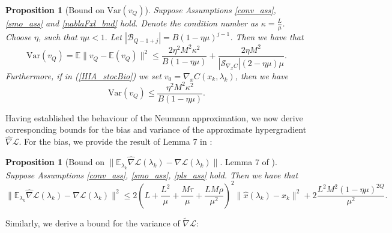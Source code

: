 \documentclass[11pt, twoside]{report}
\newtheorem{proposition}[theorem]{Proposition}
\begin{document}
\begin{proposition}[Bound on $\mathrm{Var}(v_Q)$] \label{varvq_better}
Suppose Assumptions \ref{conv_ass}, \ref{smo_ass} and \ref{nablaFxl_bnd} hold. Denote the condition number as $\kappa = \frac{L}{\mu}$. Choose $\eta$, such that $\eta \mu < 1.$ Let $|\mathcal{B}_{Q-1+j}| = B(1-\eta\mu)^{j-1}$. Then we have that
    \[\mathrm{Var}(v_Q) = \mathbb{E}\|v_Q - \mathbb{E}(v_Q)\|^2 \leq   \frac{2 \eta^2M^2 \kappa^2 }{B(1-\eta\mu)} + \frac{2 \eta M^2}{|\mathcal{S}_{\nabla_x C}| (2 - \eta \mu)\mu}.\]
    Furthermore, if in (\ref{HIA_stocBio}) we set $v_0 = \nabla_x C(x_k,\lambda_k)$, then we have
    \[\mathrm{Var}(v_Q) \leq   \frac{\eta^2M^2 \kappa^2 }{B(1-\eta\mu)}.\]
\end{proposition}

Having established the behaviour of the Neumann approximation, we now derive corresponding bounds for the bias and variance of the approximate hypergradient $\widehat{\nabla} \mathcal{L}$. For the bias, we provide the result of Lemma 7 in \cite{ji2021bilevel}:
\begin{proposition}[Bound on $\|\mathbb{E}_{\lambda_k} \widehat{\nabla} \mathcal{L}(\lambda_k) - \nabla \mathcal{L}(\lambda_k)\|.$ Lemma 7 of \cite{ji2021bilevel}] \label{nabla_hat_nabla_bnd}
Suppose Assumptions \ref{conv_ass}, \ref{smo_ass}, \ref{pls_ass} hold. Then we have that 
\[\|\mathbb{E}_{\lambda_k} \widehat{\nabla} \mathcal{L}(\lambda_k) - \nabla \mathcal{L}(\lambda_k)\|^2 \leq 2\left(L + \frac{L^2}{\mu} + \frac{M\tau}{\mu} + \frac{LM\rho}{\mu^2} \right)^2 \|\hat{x}(\lambda_k) - x_k\|^2 + 2 \frac{L^2M^2(1-\eta \mu)^{2Q}}{\mu^2}.\]
\end{proposition}

Similarly, we derive a bound for the variance of $\widetilde{\nabla} \mathcal{L}$:
\end{document}

